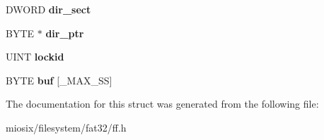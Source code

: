 \begin{DoxyCompactItemize}
\item 
\hypertarget{struct_f_i_l_ab203794f939ad4480e81dfa488770783}{D\-W\-O\-R\-D {\bfseries dir\-\_\-sect}}\label{struct_f_i_l_ab203794f939ad4480e81dfa488770783}

\item 
\hypertarget{struct_f_i_l_a5af9e9fb312b629220eaf684dd28c4a9}{B\-Y\-T\-E $\ast$ {\bfseries dir\-\_\-ptr}}\label{struct_f_i_l_a5af9e9fb312b629220eaf684dd28c4a9}

\item 
\hypertarget{struct_f_i_l_a9488efc484439c0d4d7a9b65ab80f16d}{U\-I\-N\-T {\bfseries lockid}}\label{struct_f_i_l_a9488efc484439c0d4d7a9b65ab80f16d}

\item 
\hypertarget{struct_f_i_l_a7a95fb86588663e48309b5cded7e207b}{B\-Y\-T\-E {\bfseries buf} \mbox{[}\-\_\-\-M\-A\-X\-\_\-\-S\-S\mbox{]}}\label{struct_f_i_l_a7a95fb86588663e48309b5cded7e207b}

\end{DoxyCompactItemize}


The documentation for this struct was generated from the following file\-:\begin{DoxyCompactItemize}
\item 
miosix/filesystem/fat32/ff.\-h\end{DoxyCompactItemize}
